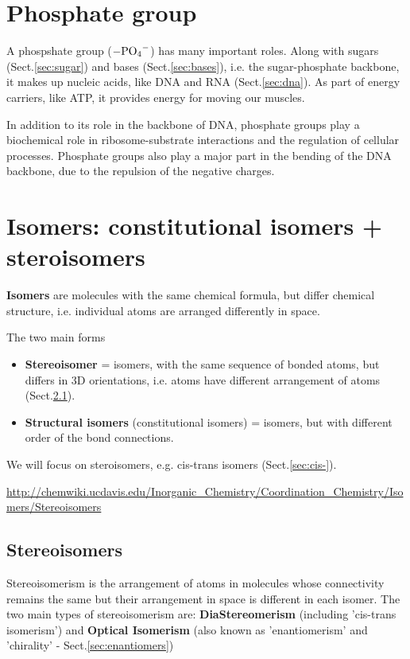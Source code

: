 \section{Phosphate group}
\label{sec:phosphate-group}


A phospshate group ($\ce{-PO4^-}$) has many important roles.
Along with sugars (Sect.\ref{sec:sugar}) and bases (Sect.\ref{sec:bases}), i.e.
the sugar-phosphate backbone, it makes up nucleic acids, like DNA and RNA
(Sect.\ref{sec:dna}). As part of energy carriers, like ATP, it provides energy
for moving our muscles.

In addition to its role in the backbone of DNA, phosphate groups play a
biochemical role in ribosome-substrate interactions and the regulation of
cellular processes. Phosphate groups also play a major part in the bending of
the DNA backbone, due to the repulsion of the negative charges. 


\section{Isomers: constitutional isomers + steroisomers}
\label{sec:isomer}

{\bf Isomers} are molecules with the same chemical formula, but differ
chemical structure, i.e. individual atoms are arranged differently in space.



The two main forms
\begin{itemize}

  \item {\bf Stereoisomer} = isomers, with the same sequence of bonded atoms,
  but differs in 3D  orientations, i.e. atoms have different arrangement of
  atoms (Sect.\ref{sec:stereoisomers}).
  
  \item {\bf Structural isomers} (constitutional isomers) = isomers, but with
  different order of the bond connections.
\end{itemize}
We will focus on steroisomers, e.g. cis-trans isomers (Sect.\ref{sec:cis-}).

\url{http://chemwiki.ucdavis.edu/Inorganic_Chemistry/Coordination_Chemistry/Isomers/Stereoisomers}

\subsection{Stereoisomers}
\label{sec:stereoisomers}

Stereoisomerism is the arrangement of atoms in molecules whose connectivity
remains the same but their arrangement in space is different in each isomer. The
two main types of stereoisomerism are: {\bf DiaStereomerism} (including
'cis-trans isomerism') and {\bf Optical Isomerism} (also known as
'enantiomerism' and 'chirality' - Sect.\ref{sec:enantiomers})

